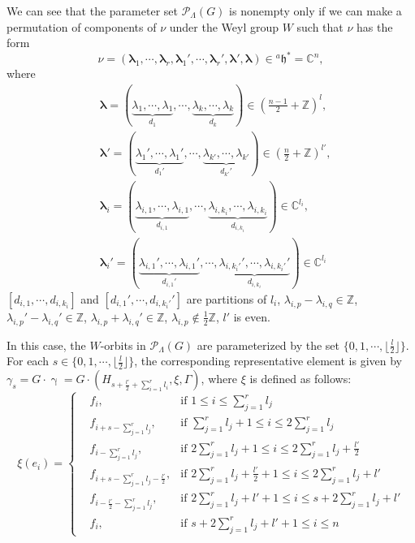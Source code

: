 \documentclass[12pt, a4paper]{amsart}
\numberwithin{equation}{section}
\newcommand{\blam}{{\boldsymbol{\lambda}}}
\newcommand{\BC}{{\mathbb {C}}}
\newcommand{\BZ}{{\mathbb {Z}}}
\newcommand{\CP}{{\mathcal {P}}}
\newcommand{\fh}{\mathfrak{h}}
\begin{document}
We can see that the parameter set $\CP_{\Lambda}(G)$ is nonempty only if we can make a permutation of components of $\nu$ under the Weyl group $W$ such that $\nu$ has the form
\begin{equation}
    \nu = (\blam_1,\cdots,\blam_r,\blam_1', \cdots, \blam_r',\blam',\blam) \in {^{a}\fh}^* = \BC^n,
\end{equation}
where 
\begin{align}
    &\blam = (\underbrace{\lambda_1,\cdots,\lambda_1}_{d_1},\cdots,\underbrace{\lambda_k,\cdots,\lambda_k}_{d_k}) \in (\frac{n-1}{2} + \BZ)^{l},\\
    &\blam' = (\underbrace{\lambda_1',\cdots,\lambda_1'}_{d_1'},\cdots,\underbrace{\lambda_{k'},\cdots,\lambda_{k'}}_{d_{k'}'}) \in (\frac{n}{2} + \BZ)^{l'},\\
    &\blam_i = (\underbrace{\lambda_{i,1},\cdots,\lambda_{i,1}}_{d_{i,1}},\cdots,\underbrace{\lambda_{i,k_i},\cdots,\lambda_{i,k_i}}_{d_{i,k_i}}) \in \BC^{l_i},\\
    &\blam_i' = (\underbrace{\lambda_{i,1}',\cdots,\lambda_{i,1}'}_{d_{i,1}'},\cdots,\underbrace{\lambda_{i,k_i'}',\cdots,\lambda_{i,k_i'}'}_{d_{i,k_i}}) \in \BC^{l_i}
\end{align}
$[d_{i,1} , \cdots , d_{i,k_i}]$ and $[d_{i,1}',\cdots,d_{i,k_i'}']$ are partitions of $l_i$, $\lambda_{i,p} - \lambda_{i,q} \in \BZ$, $\lambda_{i,p}' - \lambda_{i,q}' \in \BZ$, $\lambda_{i,p} + \lambda_{i,q}' \in \BZ$, $\lambda_{i,p} \notin \frac{1}{2}\BZ$, $l'$ is even. 

In this case, the $W$-orbits in $\CP_{\Lambda}(G)$ are parameterized by the set $\{0,1,\cdots,\lfloor \frac{l}{2} \rfloor\}$. For each $s \in \{0,1,\cdots,\lfloor \frac{l}{2} \rfloor\}$, the corresponding representative element is given by $\gamma_s =G \cdot \upgamma = G \cdot (H_{s + \frac{l'}{2} + \sum_{i=1}^{r} l_i},\xi,\Gamma)$, where $\xi$ is defined as follows:
$$
\xi(e_i) = \left\{
    \begin{aligned}
    &  f_i , & \textrm{if $1 \leq i \leq \sum_{j=1}^{r} l_j$}\\
    &  f_{i+s - \sum_{j=1}^r l_j}, & \textrm{if $\sum_{j=1}^{r} l_j +1 \leq i \leq 2\sum_{j=1}^{r} l_j$}\\
    &  f_{i - \sum_{j=1}^{r}l_j}, & \textrm{if $2\sum_{j=1}^{r}l_j+1 \leq i \leq 2\sum_{j=1}^{r}l_j + \frac{l'}{2}$}\\
    &  f_{i+s-\sum_{j=1}^{r}l_j-\frac{l'}{2}}, & \textrm{if $2\sum_{j=1}^{r}l_j + \frac{l'}{2} +1 \leq i \leq 2\sum_{j=1}^{r}l_j + l'$}\\
    & f_{i - \frac{l'}{2}-\sum_{j=1}^{r}l_j}, & \textrm{if $2\sum_{j=1}^{r}l_j + l' + 1 \leq i \leq s+2\sum_{j=1}^{r}l_j + l'$}\\
    &f_{i}, & \textrm{if $s+2\sum_{j=1}^{r}l_j + l' +1 \leq i \leq n$}
    \end{aligned}
\right.
$$
\end{document}
